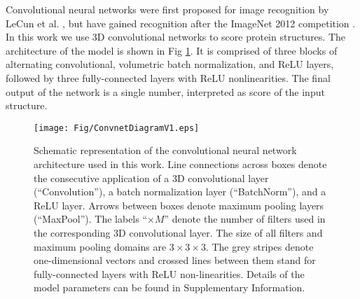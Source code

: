Convolutional neural networks were first proposed for image
recognition by LeCun et al. \cite{lecun1989backpropagation}, but have
gained recognition after the ImageNet 2012
competition \cite{krizhevsky2012imagenet}.  In this work we use 3D
convolutional networks to score protein structures. The architecture
of the model is shown in Fig \ref{Fig:CNNModel}.  It is comprised of
three blocks of alternating convolutional, volumetric batch
normalization, and ReLU layers, followed by three fully-connected
layers with ReLU nonlinearities. The final output of the network is a
single number, interpreted as  score of the input structure.

\begin{figure}[H]
    \centering
    \texttt{[image: Fig/ConvnetDiagramV1.eps]}

    \caption{Schematic representation of the convolutional neural
    network architecture used in this work.  Line connections across
    boxes denote the consecutive application of a 3D convolutional
    layer (``Convolution''), a batch normalization layer
    (``BatchNorm''), and a ReLU layer. Arrows between boxes denote
    maximum pooling layers (``MaxPool''). The labels ``$\times M$''
    denote the number of filters used in the corresponding 3D
    convolutional layer. The size of all filters and maximum pooling
    domains are $3\times 3\times 3$. The grey stripes denote
    one-dimensional vectors and crossed lines between them stand for
    fully-connected layers with ReLU non-linearities. Details of the
    model parameters can be found in Supplementary Information.}

    \label{Fig:CNNModel}
\end{figure}

